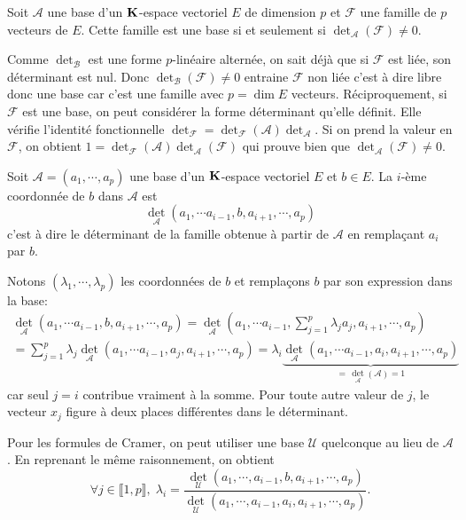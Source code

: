 \begin{thm}
 Soit $\mathcal{A}$ une base d'un $\mathbf{K}$-espace vectoriel $E$ de dimension $p$ et $\mathcal{F}$ une famille de $p$ vecteurs de $E$. Cette famille est une base si et seulement si $\det_{\mathcal{A}}(\mathcal{F})\neq 0$.
\end{thm}
\begin{demo}
 Comme $\det_{\mathcal{B}}$ est une forme $p$-linéaire alternée, on sait déjà que si $\mathcal{F}$ est liée, son déterminant est nul. Donc $\det_{\mathcal{B}}(\mathcal{F})\neq 0$ entraine $\mathcal{F}$ non liée c'est à dire libre donc une base car c'est une famille avec $p=\dim E$ vecteurs.\newline
Réciproquement, si $\mathcal{F}$ est une base, on peut considérer la forme déterminant qu'elle définit. Elle vérifie l'identité fonctionnelle $ \det_{\mathcal{F}} = \det_{\mathcal{F}}(\mathcal{A})\det_{\mathcal{A}}$.\newline
Si on prend la valeur en $\mathcal{F}$, on obtient $1=\det_{\mathcal{F}}(\mathcal{A})\det_{\mathcal{A}}(\mathcal{F})$ qui prouve bien que $\det_{\mathcal{A}}(\mathcal{F})\neq 0$.
\end{demo}
\begin{propn}
 Soit $\mathcal{A} = (a_1,\cdots, a_p)$ une base d'un $\mathbf{K}$-espace vectoriel $E$ et $b\in E$. La $i$-ème coordonnée de $b$ dans $\mathcal{A}$ est 
 \[
  \det_{\mathcal{A}}(a_1, \cdots a_{i-1},b,a_{i+1}, \cdots, a_{p})
 \]
c'est à dire le déterminant  de la famille obtenue à partir de $\mathcal{A}$ en remplaçant $a_i$ par $b$.
\end{propn}
\begin{demo}
Notons $(\lambda_1, \cdots, \lambda_p)$ les coordonnées de $b$ et remplaçons $b$ par son expression dans la base:
\begin{multline*}
\det_{\mathcal{A}}(a_1, \cdots a_{i-1},b,a_{i+1}, \cdots, a_{p})
=
\det_{\mathcal{A}}(a_1, \cdots a_{i-1},\sum_{j=1}^{p}\lambda_j a_j,a_{i+1}, \cdots, a_{p})\\
=
\sum_{j=1}^{p}\lambda_j \det_{\mathcal{A}}(a_1, \cdots a_{i-1}, a_j,a_{i+1}, \cdots, a_{p})
=
\lambda_i \underset{=\, \det_{\mathcal{A}}(\mathcal{A})  = 1}{\underbrace{\det_{\mathcal{A}}(a_1, \cdots a_{i-1}, a_i,a_{i+1}, \cdots, a_{p})}}
\end{multline*}
car seul $j=i$ contribue vraiment à la somme. Pour toute autre valeur de $j$, le vecteur $x_j$ figure à deux places différentes dans le déterminant.
\end{demo}
\begin{rem}
  Pour les formules de Cramer, on peut utiliser une base $\mathcal{U}$ quelconque au lieu de $\mathcal{A}$. En reprenant le même raisonnement, on obtient
\[
  \forall j \in \llbracket 1,p \rrbracket,\; \lambda_i = \frac{\det_{\mathcal{U}}(a_1,\cdots,a_{i-1},b,a_{i+1},\cdots,a_p)}{\det_{\mathcal{U}}(a_1,\cdots,a_{i-1},a_i,a_{i+1},\cdots,a_p)}.
\]

\end{rem}

